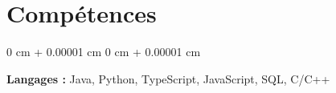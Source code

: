 \documentclass[10pt, letterpaper]{article}
\newenvironment{highlights}{
    \begin{itemize}[
        topsep=0.10 cm,
        parsep=0.10 cm,
        partopsep=0pt,
        itemsep=0pt,
        leftmargin=0 cm + 10pt
    ]
}{
    \end{itemize}
} %
\newenvironment{onecolentry}{
    \begin{adjustwidth}{
        0 cm + 0.00001 cm
    }{
        0 cm + 0.00001 cm
    }
}{
    \end{adjustwidth}
} %
\begin{document}

    \section{Compétences}

        \begin{onecolentry}
            \textbf{Langages :} Java, Python, TypeScript, JavaScript, SQL, C/C++
        \end{onecolentry}
        \vspace{0.2 cm}
        
\end{document}
